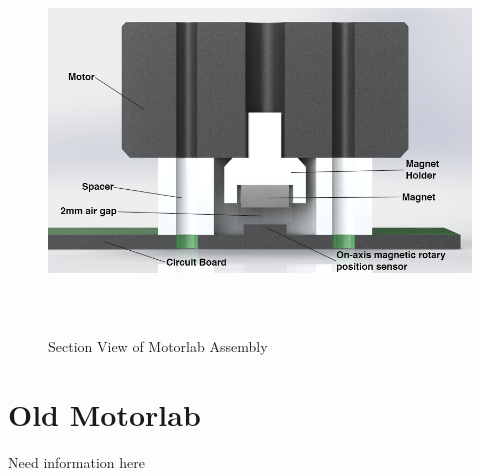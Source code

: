 \begin{figure}[htb]%

    \includegraphics[height=4in]{figures/section_view_motorlab_assembly.png}

    \caption[Section View of Motorlab Assembly]{Section View of Motorlab Assembly}

    \label{section_view_motorlab}
\end{figure}


\section{Old Motorlab}
\label{makereference2.2} 

Need information here